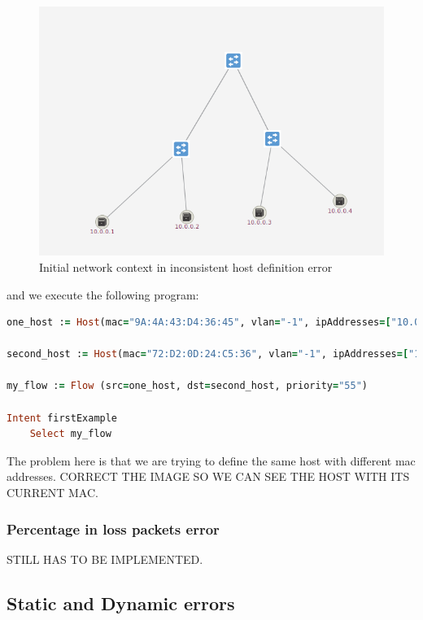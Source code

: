 \begin{figure}[H]
\centering
\includegraphics[width=\textwidth]{images/haikunet/error_scenario_3.png}
\caption{Initial network context in inconsistent host definition error}
\end{figure}

and we execute the following program:

\begin{lstlisting}[language=Ruby,breaklines=true]
one_host := Host(mac="9A:4A:43:D4:36:45", vlan="-1", ipAddresses=["10.0.0.1"], elementId="of:0000000000000002", port="1")

second_host := Host(mac="72:D2:0D:24:C5:36", vlan="-1", ipAddresses=["10.0.0.4"], elementId="of:0000000000000003", port="2")

my_flow := Flow (src=one_host, dst=second_host, priority="55")

Intent firstExample
    Select my_flow
\end{lstlisting}

The problem here is that we are trying to define the same host with different mac addresses. CORRECT THE IMAGE SO WE CAN SEE THE HOST WITH ITS CURRENT MAC.

\subsubsection{Percentage in loss packets error}

STILL HAS TO BE IMPLEMENTED.

\subsection{Static and Dynamic errors}

